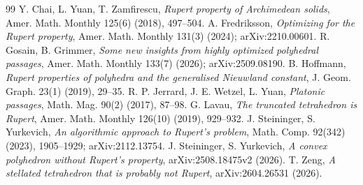 \documentclass[11pt]{amsart}
\theoremstyle{definition}
\begin{document}
\begin{thebibliography}{99}
 Y. Chai, L. Yuan, T. Zamfirescu, \emph{Rupert property of Archimedean solids}, Amer. Math. Monthly 125(6) (2018), 497--504.
 A. Fredriksson, \emph{Optimizing for the Rupert property}, Amer. Math. Monthly 131(3) (2024); arXiv:2210.00601.
 R. Gosain, B. Grimmer, \emph{Some new insights from highly optimized polyhedral passages}, Amer. Math. Monthly 133(7) (2026); arXiv:2509.08190.
 B. Hoffmann, \emph{Rupert properties of polyhedra and the generalised Nieuwland constant}, J. Geom. Graph. 23(1) (2019), 29--35.
 R. P. Jerrard, J. E. Wetzel, L. Yuan, \emph{Platonic passages}, Math. Mag. 90(2) (2017), 87--98.
 G. Lavau, \emph{The truncated tetrahedron is Rupert}, Amer. Math. Monthly 126(10) (2019), 929--932.
 J. Steininger, S. Yurkevich, \emph{An algorithmic approach to Rupert's problem}, Math. Comp. 92(342) (2023), 1905--1929; arXiv:2112.13754.
 J. Steininger, S. Yurkevich, \emph{A convex polyhedron without Rupert's property}, arXiv:2508.18475v2 (2026).
 T. Zeng, \emph{A stellated tetrahedron that is probably not Rupert}, arXiv:2604.26531 (2026).
\end{thebibliography}
\end{document}
